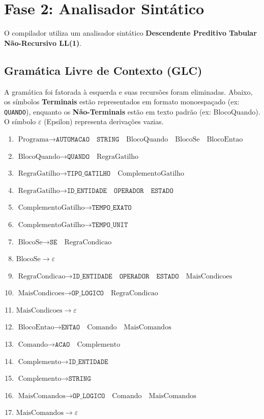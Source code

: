 \documentclass[12pt, a4paper]{article}
\begin{document}
\section{Fase 2: Analisador Sintático}
O compilador utiliza um analisador sintático \textbf{Descendente Preditivo Tabular Não-Recursivo LL(1)}.

\subsection{Gramática Livre de Contexto (GLC)}
A gramática foi fatorada à esquerda e suas recursões foram eliminadas. Abaixo, os símbolos \textbf{Terminais} estão representados em formato monoespaçado (ex: \texttt{QUANDO}), enquanto os \textbf{Não-Terminais} estão em texto padrão (ex: BlocoQuando). O símbolo $\varepsilon$ (Epsilon) representa derivações vazias.

\begin{enumerate}
    \item $\text{Programa} \rightarrow \texttt{AUTOMACAO} \quad \texttt{STRING} \quad \text{BlocoQuando} \quad \text{BlocoSe} \quad \text{BlocoEntao}$
    \item $\text{BlocoQuando} \rightarrow \texttt{QUANDO} \quad \text{RegraGatilho}$
    \item $\text{RegraGatilho} \rightarrow \texttt{TIPO\_GATILHO} \quad \text{ComplementoGatilho}$
    \item $\text{RegraGatilho} \rightarrow \texttt{ID\_ENTIDADE} \quad \texttt{OPERADOR} \quad \texttt{ESTADO}$
    \item $\text{ComplementoGatilho} \rightarrow \texttt{TEMPO\_EXATO}$
    \item $\text{ComplementoGatilho} \rightarrow \texttt{TEMPO\_UNIT}$
    \item $\text{BlocoSe} \rightarrow \texttt{SE} \quad \text{RegraCondicao}$
    \item $\text{BlocoSe} \rightarrow \varepsilon$
    \item $\text{RegraCondicao} \rightarrow \texttt{ID\_ENTIDADE} \quad \texttt{OPERADOR} \quad \texttt{ESTADO} \quad \text{MaisCondicoes}$
    \item $\text{MaisCondicoes} \rightarrow \texttt{OP\_LOGICO} \quad \text{RegraCondicao}$
    \item $\text{MaisCondicoes} \rightarrow \varepsilon$
    \item $\text{BlocoEntao} \rightarrow \texttt{ENTAO} \quad \text{Comando} \quad \text{MaisComandos}$
    \item $\text{Comando} \rightarrow \texttt{ACAO} \quad \text{Complemento}$
    \item $\text{Complemento} \rightarrow \texttt{ID\_ENTIDADE}$
    \item $\text{Complemento} \rightarrow \texttt{STRING}$
    \item $\text{MaisComandos} \rightarrow \texttt{OP\_LOGICO} \quad \text{Comando} \quad \text{MaisComandos}$
    \item $\text{MaisComandos} \rightarrow \varepsilon$
\end{enumerate}
\end{document}
